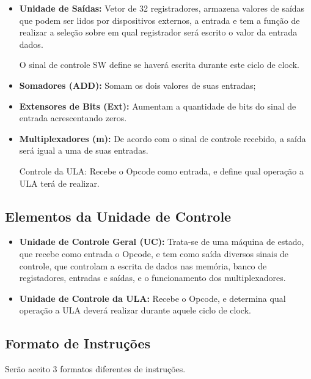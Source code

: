 \begin{itemize}
\item \textbf{Unidade de Saídas:} Vetor de 32 registradores, armazena valores de saídas que podem ser lidos por dispositivos externos, a entrada e tem a função de realizar a seleção sobre em qual registrador será escrito o valor da entrada dados.

O sinal de controle SW define se haverá escrita durante este ciclo de clock.


\item \textbf{Somadores (ADD):} Somam os dois valores de suas entradas;

\item \textbf{Extensores de Bits (Ext):} Aumentam a quantidade de bits do sinal de entrada acrescentando zeros.

\item \textbf{Multiplexadores (m):} De acordo com o sinal de controle recebido, a saída será igual a uma de suas entradas.

Controle da ULA: Recebe o Opcode como entrada, e define qual operação a ULA terá de realizar.

\end{itemize}

\subsection{Elementos da Unidade de Controle}

\begin{itemize}

\item \textbf{Unidade de Controle Geral (UC):} Trata-se de uma máquina de estado, que recebe como entrada o Opcode, e tem como saída diversos sinais de controle, que controlam a escrita de dados nas memória, banco de registadores, entradas e saídas, e o funcionamento dos multiplexadores. 

\item \textbf{Unidade de Controle da ULA:} Recebe o Opcode, e determina qual operação a ULA deverá realizar durante aquele ciclo de clock.

\end{itemize}



\subsection{Formato de Instruç\~oes}

Serão aceito 3 formatos diferentes de instruções.

